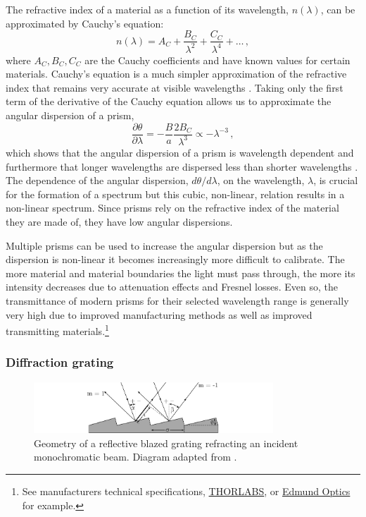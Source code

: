 The refractive index of a material as a function of its wavelength, $n(\lambda)$, can be approximated by Cauchy's equation:
\begin{equation}
    n(\lambda) = A_{C} + \frac{B_{C}}{\lambda^{2}} + \frac{C_{C}}{\lambda^{4}} + \dots\,,\label{eq:Cauchy}
\end{equation}
where $A_{C}, B_{C}, C_{C}$ are the Cauchy coefficients and have known values for certain materials. Cauchy's equation is a much simpler approximation of the refractive index that remains very accurate at visible wavelengths \citep{JenkinsOptics}. Taking only the first term of the derivative of the Cauchy equation allows us to approximate the angular dispersion of a prism,
\begin{equation}
    \frac{\partial \theta}{\partial \lambda} = -\frac{B}{a}\frac{2B_{C}}{\lambda^{3}} \propto -\lambda^{-3}\,,\label{eq:prism_angular_dispersion_approx}
\end{equation}
which shows that the angular dispersion of a prism is wavelength dependent and furthermore that longer wavelengths are dispersed less than shorter wavelengths \citep{BirneyObsAstro, Hecht_optics}. The dependence of the angular dispersion, $d\theta/d\lambda$, on the wavelength, $\lambda$, is crucial for the formation of a spectrum but this cubic, non-linear, relation results in a non-linear spectrum. Since prisms rely on the refractive index of the material they are made of, they have low angular dispersions.

Multiple prisms can be used to increase the angular dispersion but as the dispersion is non-linear it becomes increasingly more difficult to calibrate. The more material and material boundaries the light must pass through, the more its intensity decreases due to attenuation effects and Fresnel losses. Even so, the transmittance of modern prisms for their selected wavelength range is generally very high due to improved manufacturing methods as well as improved transmitting materials.\footnote{See manufacturers technical specifications, \href{https://www.thorlabs.com/newgrouppage9.cfm?objectgroup_id=148}{THORLABS}, or \href{https://www.edmundoptics.eu/c/prisms/607/}{Edmund Optics} for example.}
\enlargethispage{-2\baselineskip}

\subsubsection{Diffraction grating}\label{subsubsec:diff_grat}

\begin{figure}[t]
    \centering
    \includegraphics[width = 9cm]{figures/2_grating_diagram.pdf}
    \caption{Geometry of a reflective blazed grating refracting an incident monochromatic beam. Diagram adapted from \cite{BirneyObsAstro}.}
    \label{fig:grating_diagram}
\end{figure}

